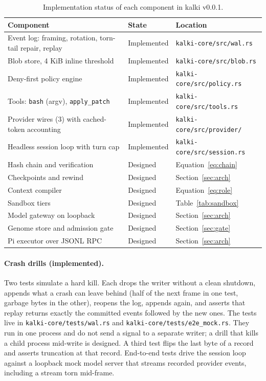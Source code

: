 \documentclass[11pt,a4paper]{article}
\begin{document}
\begin{table}[h]
\centering
\small
\begin{tabularx}{\textwidth}{@{}Xll@{}}
\toprule
Component & State & Location \\
\midrule
Event log: framing, rotation, torn-tail repair, replay & Implemented & \texttt{kalki-core/src/wal.rs} \\
Blob store, 4 KiB inline threshold & Implemented & \texttt{kalki-core/src/blob.rs} \\
Deny-first policy engine & Implemented & \texttt{kalki-core/src/policy.rs} \\
Tools: \texttt{bash} (argv), \texttt{apply\_patch} & Implemented & \texttt{kalki-core/src/tools.rs} \\
Provider wires (3) with cached-token accounting & Implemented & \texttt{kalki-core/src/provider/} \\
Headless session loop with turn cap & Implemented & \texttt{kalki-core/src/session.rs} \\
Hash chain and verification & Designed & Equation~\eqref{eq:chain} \\
Checkpoints and rewind & Designed & Section~\ref{sec:arch} \\
Context compiler & Designed & Equation~\eqref{eq:role} \\
Sandbox tiers & Designed & Table~\ref{tab:sandbox} \\
Model gateway on loopback & Designed & Section~\ref{sec:arch} \\
Genome store and admission gate & Designed & Section~\ref{sec:gate} \\
Pi executor over JSONL RPC & Designed & Section~\ref{sec:arch} \\
\bottomrule
\end{tabularx}
\caption{Implementation status of each component in kalki v0.0.1.}
\label{tab:status}
\end{table}

\paragraph{Crash drills (implemented).} Two tests simulate a hard kill. Each drops the writer without a clean shutdown, appends what a crash can leave behind (half of the next frame in one test, garbage bytes in the other), reopens the log, appends again, and asserts that replay returns exactly the committed events followed by the new ones. The tests live in \texttt{kalki-core/tests/wal.rs} and \texttt{kalki-core/tests/e2e\_mock.rs}. They run in one process and do not send a signal to a separate writer; a drill that kills a child process mid-write is designed. A third test flips the last byte of a record and asserts truncation at that record. End-to-end tests drive the session loop against a loopback mock model server that streams recorded provider events, including a stream torn mid-frame.
\end{document}
